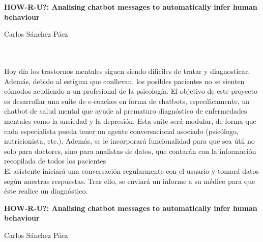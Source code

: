 
\cleardoublepage
\thispagestyle{empty}

\begin{center}
{\large\bfseries HOW-R-U?: Analising chatbot messages to automatically infer human behaviour}\\
\end{center}
\begin{center}
Carlos Sánchez Páez\\
\end{center}

\\

\vspace{0.7cm}
\\

Hoy día los trastornos mentales siguen siendo difíciles de tratar y diagnosticar. Además, debido al estigma que conllevan, los posibles pacientes
no se sienten cómodos acudiendo a un profesional de la psicología. El objetivo de este proyecto es desarrollar una suite de e-coaches en forma de
chatbots, específicamente, un chatbot de salud mental que ayude al prematuro diagnóstico de enfermedades mentales como la ansiedad y la depresión. Esta suite será modular, de forma que cada especialista pueda tener un agente conversacional asociado (psicólogo, nutricionista, etc.). Además, se le incorporará funcionalidad para que sea útil no solo para doctores, sino para analistas de datos, que contarán con la información recopilada de todos los pacientes\\

El asistente iniciará una conversación regularmente con el usuario y tomará datos según nuestras respuestas. Tras ello, se enviará un informe a su
médico para que éste realice un diagnóstico.
\cleardoublepage


\thispagestyle{empty}


\begin{center}
{\large\bfseries HOW-R-U?: Analising chatbot messages to automatically infer human behaviour}\\
\end{center}
\begin{center}
Carlos Sánchez Páez\\
\end{center}

\\

